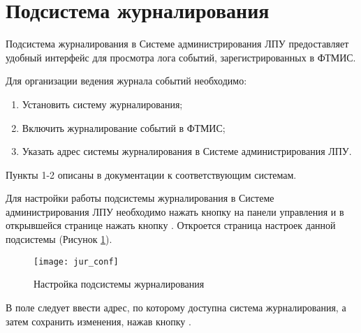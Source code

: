 \newpage
\section{Подсистема журналирования}

Подсистема журналирования в Системе администрирования ЛПУ предоставляет удобный интерфейс для просмотра лога событий, зарегистрированных в ФТМИС.

Для организации ведения журнала событий необходимо:
\begin{enumerate}
 \item Установить систему журналирования;
 \item Включить журналирование событий в ФТМИС;
 \item Указать адрес системы журналирования в Системе администрирования ЛПУ.
\end{enumerate}
 
Пункты 1-2 описаны в документации к соответствующим системам.

Для настройки работы подсистемы журналирования в Системе администрирования ЛПУ необходимо нажать кнопку   на панели управления и в открывшейся странице нажать кнопку . Откроется страница настроек данной подсистемы (Рисунок \ref{img_jur_conf}).

\begin{figure}[ht]\centering
 \texttt{[image: jur\_conf]}
 \caption{Настройка подсистемы журналирования}
 \label{img_jur_conf}
\end{figure}

В поле  следует ввести адрес, по которому доступна система журналирования, а затем сохранить изменения, нажав кнопку .